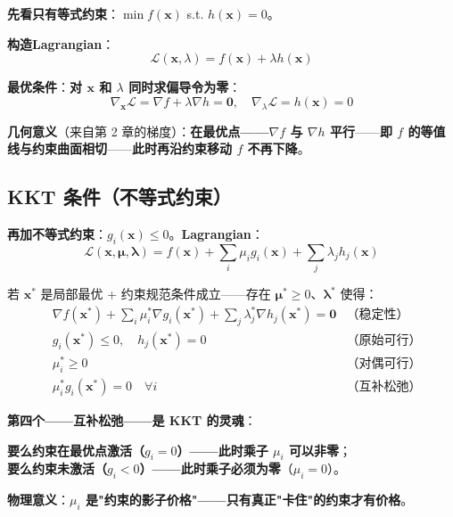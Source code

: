 \textbf{先看只有等式约束}：$\min f(\bm x)$ s.t. $h(\bm x) = 0$。

\textbf{构造\textbf{Lagrangian}}：
\begin{equation}
\mathcal{L}(\bm x, \lambda) = f(\bm x) + \lambda h(\bm x)
\end{equation}

\textbf{最优条件}：\textbf{对 $\bm x$ 和 $\lambda$ 同时求偏导令为零}：
\begin{equation}
\nabla_{\bm x} \mathcal{L} = \nabla f + \lambda \nabla h = \bm 0, \quad \nabla_\lambda \mathcal{L} = h(\bm x) = 0
\end{equation}

\textbf{几何意义}（来自第 2 章的梯度）：\textbf{在最优点——$\nabla f$ 与 $\nabla h$ 平行}——\textbf{即 $f$ 的等值线与约束曲面\textbf{相切}}——\textbf{此时再沿约束移动 $f$ 不再下降}。

\subsection{KKT 条件（不等式约束）}

\textbf{再加不等式约束}：$g_i(\bm x) \le 0$。\textbf{Lagrangian}：
\begin{equation}
\mathcal{L}(\bm x, \bm \mu, \bm \lambda) = f(\bm x) + \sum_i \mu_i g_i(\bm x) + \sum_j \lambda_j h_j(\bm x)
\end{equation}

\begin{theorem}
若 $\bm x^*$ 是局部最优 + 约束规范条件成立——存在 $\bm \mu^* \ge 0$、$\bm \lambda^*$ 使得：
\begin{align}
&\nabla f(\bm x^*) + \sum_i \mu_i^* \nabla g_i(\bm x^*) + \sum_j \lambda_j^* \nabla h_j(\bm x^*) = \bm 0 & \text{（稳定性）}\\
&g_i(\bm x^*) \le 0, \quad h_j(\bm x^*) = 0 & \text{（原始可行）}\\
&\mu_i^* \ge 0 & \text{（对偶可行）}\\
&\mu_i^* g_i(\bm x^*) = 0 \quad \forall i & \text{（互补松弛）}
\end{align}
\end{theorem}

\textbf{第四个——\textbf{互补松弛}——是 KKT 的灵魂}：

\textbf{要么约束在最优点\textbf{激活}（$g_i = 0$）——此时乘子 $\mu_i$ 可以非零}；\\
\textbf{要么约束\textbf{未激活}（$g_i < 0$）——此时乘子必须为零}（$\mu_i = 0$）。

\textbf{物理意义}：\textbf{$\mu_i$ 是"约束的\textbf{影子价格}"——只有真正"卡住"的约束才有价格}。

